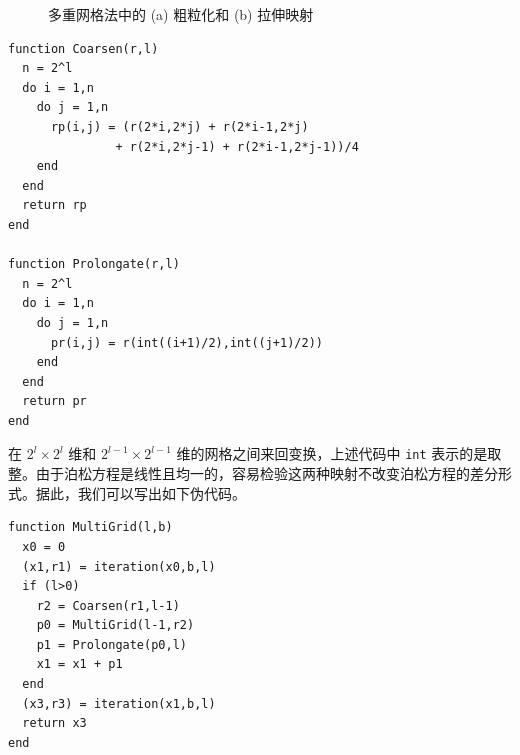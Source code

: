 \begin{figure}[htbp]
\centering
{}
\caption{多重网格法中的 (a) 粗粒化和 (b) 拉伸映射}
\label{fig:multigrid-map}
\end{figure}

\begin{algorithmBox}
\begin{lstlisting}[style=bellacode]
function Coarsen(r,l)
  n = 2^l
  do i = 1,n
    do j = 1,n
      rp(i,j) = (r(2*i,2*j) + r(2*i-1,2*j)
               + r(2*i,2*j-1) + r(2*i-1,2*j-1))/4
    end
  end
  return rp
end

function Prolongate(r,l)
  n = 2^l
  do i = 1,n
    do j = 1,n
      pr(i,j) = r(int((i+1)/2),int((j+1)/2))
    end
  end
  return pr
end
\end{lstlisting}
\end{algorithmBox}

在 $2^l\times2^l$ 维和 $2^{l-1}\times2^{l-1}$ 维的网格之间来回变换，上述代码中 \texttt{int} 表示的是取整。由于泊松方程是线性且均一的，容易检验这两种映射不改变泊松方程的差分形式。据此，我们可以写出如下伪代码。

\begin{algorithmBox}
\begin{lstlisting}[style=bellacode]
function MultiGrid(l,b)
  x0 = 0
  (x1,r1) = iteration(x0,b,l)
  if (l>0)
    r2 = Coarsen(r1,l-1)
    p0 = MultiGrid(l-1,r2)
    p1 = Prolongate(p0,l)
    x1 = x1 + p1
  end
  (x3,r3) = iteration(x1,b,l)
  return x3
end
\end{lstlisting}
\end{algorithmBox}

